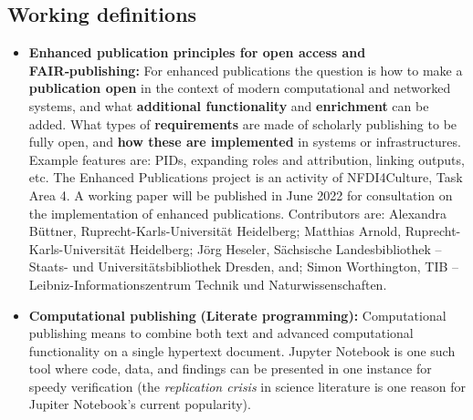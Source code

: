 \documentclass{article}
\begin{document}
\subsection{Working definitions}\label{H6504202}


\begin{itemize}
\item \textbf{Enhanced publication principles for open access and FAIR‑publishing}\textbf{:} For enhanced publications the question is how to make a \textbf{publication open} in the context of modern computational and networked systems, and what \textbf{additional functionality} and \textbf{enrichment} can be added. What types of \textbf{requirements }are made of scholarly publishing to be fully open, and \textbf{how these are implemented }in systems or infrastructures. Example features are: PIDs, expanding roles and attribution, linking outputs, etc. The Enhanced Publications project is an activity of NFDI4Culture, Task Area 4. A working paper will be published in June 2022 for consultation on the implementation of enhanced publications. Contributors are: Alexandra Büttner, Ruprecht-Karls-Universität Heidelberg; Matthias Arnold, Ruprecht-Karls-Universität Heidelberg; Jörg Heseler, Sächsische Landesbibliothek – Staats- und Universitätsbibliothek Dresden, and; Simon Worthington, TIB – Leibniz-Informationszentrum Technik und Naturwissenschaften.


\item \textbf{Computational publishing}\textbf{ (Literate programming): }\autocite{KnuthDonald1992} Computational publishing means to combine both text and advanced computational functionality on a single hypertext document. Jupyter Notebook is one such tool where code, data, and findings can be presented in one instance for speedy verification (the \emph{replication crisis} in science literature is one reason for Jupiter Notebook's current popularity).



\end{itemize}
\end{document}
